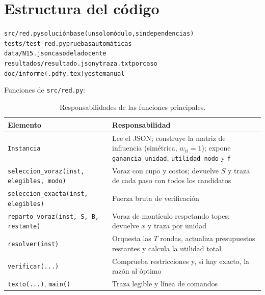 \documentclass[11pt,a4paper]{article}
\begin{document}
\section{Estructura del código}

\begin{alltt}
src/red.py            solución base (un solo módulo, sin dependencias)
tests/test\_red.py     pruebas automáticas
data/N15.json         caso de la docente
resultados/           resultado.json y traza.txt por caso
doc/                  informe (.pdf y .tex) y este manual
\end{alltt}

Funciones de \texttt{src/red.py}:

\begin{table}[htbp]
\centering
\small
\renewcommand{\arraystretch}{1.2}
\begin{tabularx}{\textwidth}{@{}>{\raggedright\arraybackslash}p{5.6cm}>{\raggedright\arraybackslash}X@{}}
\toprule
Elemento & Responsabilidad \\
\midrule
\texttt{Instancia} &
Lee el JSON; construye la matriz de influencia (simétrica, $w_{ii}=1$);
expone \texttt{ganancia\_unidad}, \texttt{utilidad\_nodo} y \texttt{f} \\
\addlinespace
\texttt{seleccion\_voraz(inst, elegibles, modo)} &
Voraz con cupo y costos; devuelve $S$ y traza de cada paso con todos los
candidatos \\
\addlinespace
\texttt{seleccion\_exacta(inst, elegibles)} &
Fuerza bruta de verificación \\
\addlinespace
\texttt{reparto\_voraz(inst, S, B, restante)} &
Voraz de montículo respetando topes; devuelve $x$ y traza por unidad \\
\addlinespace
\texttt{resolver(inst)} &
Orquesta las $T$ rondas, actualiza presupuestos restantes y calcula la utilidad
total \\
\addlinespace
\texttt{verificar(...)} &
Comprueba restricciones y, si hay exacto, la razón al óptimo \\
\addlinespace
\texttt{texto(...)}, \texttt{main()} &
Traza legible y línea de comandos \\
\bottomrule
\end{tabularx}
\caption{Responsabilidades de las funciones principales.}
\end{table}

\end{document}
